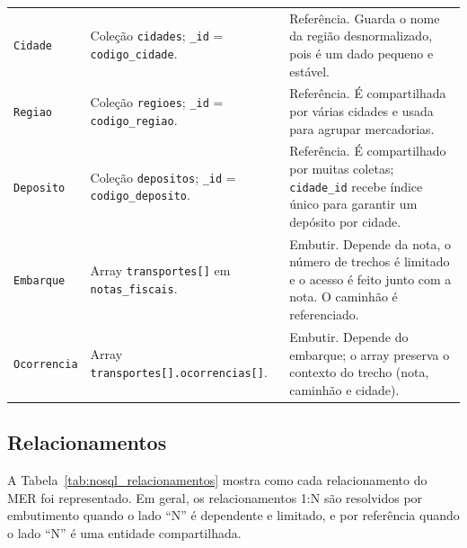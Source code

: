 {\begin{longtable}{@{}L{2.6cm}L{4.4cm}L{8.4cm}@{}}
\texttt{Cidade} & Coleção \texttt{cidades}; \texttt{\_id} = \texttt{codigo\_cidade}. & Referência. Guarda o nome da região desnormalizado, pois é um dado pequeno e estável.\\

\texttt{Regiao} & Coleção \texttt{regioes}; \texttt{\_id} = \texttt{codigo\_regiao}. & Referência. É compartilhada por várias cidades e usada para agrupar mercadorias.\\

\texttt{Deposito} & Coleção \texttt{depositos}; \texttt{\_id} = \texttt{codigo\_deposito}. & Referência. É compartilhado por muitas coletas; \texttt{cidade\_id} recebe índice único para garantir um depósito por cidade.\\

\texttt{Embarque} & Array \texttt{transportes[]} em \texttt{notas\_fiscais}. & Embutir. Depende da nota, o número de trechos é limitado e o acesso é feito junto com a nota. O caminhão é referenciado.\\

\texttt{Ocorrencia} & Array \texttt{transportes[].\allowbreak ocorrencias[]}. & Embutir. Depende do embarque; o array preserva o contexto do trecho (nota, caminhão e cidade).\\
\end{longtable}
}

\subsection{Relacionamentos}

A Tabela~\ref{tab:nosql_relacionamentos} mostra como cada relacionamento do MER foi representado. Em geral, os relacionamentos 1:N são resolvidos por embutimento quando o lado ``N'' é dependente e limitado, e por referência quando o lado ``N'' é uma entidade compartilhada.

